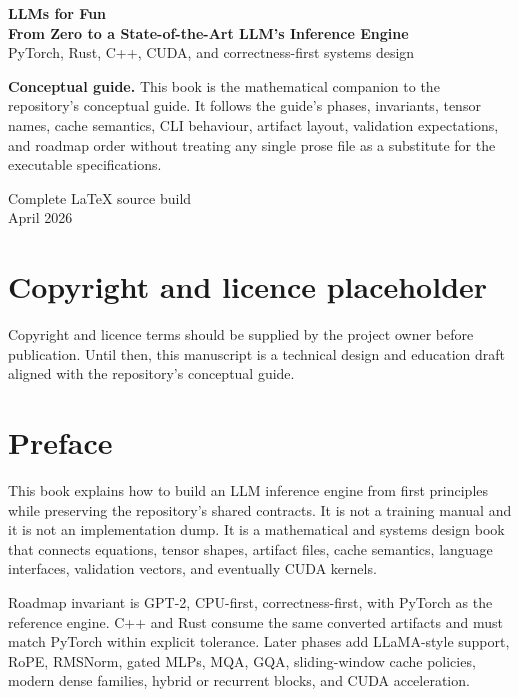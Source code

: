 \begin{titlepage}
\centering
\vspace*{18mm}
{\Huge\bfseries\color{EngineBlue} LLMs for Fun\\[2mm]}
{\LARGE\bfseries From Zero to a State-of-the-Art LLM's Inference Engine\\[10mm]}
{\Large PyTorch, Rust, C++, CUDA, and correctness-first systems design\\[16mm]}
\begin{tcolorbox}[enhanced,colback=EngineGrey,colframe=EngineBlue!70,arc=2mm,width=0.82\textwidth]
\centering
\textbf{Conceptual guide.} This book is the mathematical companion to the repository's conceptual guide. It follows the guide's phases, invariants, tensor names, cache semantics, CLI behaviour, artifact layout, validation expectations, and roadmap order without treating any single prose file as a substitute for the executable specifications.
\end{tcolorbox}
\vfill
{\large Complete LaTeX source build\\}
{\large April 2026}
\end{titlepage}

\chapter*{Copyright and licence placeholder}
Copyright and licence terms should be supplied by the project owner before publication. Until then, this manuscript is a technical design and education draft aligned with the repository's conceptual guide.

\chapter*{Preface}
This book explains how to build an LLM inference engine from first principles while preserving the repository's shared contracts. It is not a training manual and it is not an implementation dump. It is a mathematical and systems design book that connects equations, tensor shapes, artifact files, cache semantics, language interfaces, validation vectors, and eventually CUDA kernels.

\begin{contractbox}{Roadmap invariant}
\phasezero{} is GPT-2, CPU-first, correctness-first, with PyTorch as the reference engine. C++ and Rust consume the same converted artifacts and must match PyTorch within explicit tolerance. Later phases add LLaMA-style support, RoPE, RMSNorm, gated MLPs, MQA, GQA, sliding-window cache policies, modern dense families, hybrid or recurrent blocks, and CUDA acceleration.
\end{contractbox}

